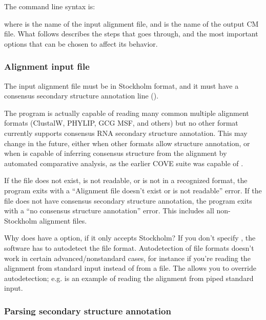 The  command line syntax is:


where \prog{[alifile]} is the name of the input alignment file, and
\prog{[cmfile]} is the name of the output CM file. What follows
describes the steps that  goes through, and the most
important options that can be chosen to affect its behavior.

\subsubsection{Alignment input file}

The input alignment file must be in Stockholm format, and it must have
a consensus secondary structure annotation line ().

The program is actually capable of reading many common multiple
alignment formats (ClustalW, PHYLIP, GCG MSF, and others) but no other
format currently supports consensus RNA secondary structure
annotation. This may change in the future, either when other formats
allow structure annotation, or when  is capable of
inferring consensus structure from the alignment by automated
comparative analysis, as the earlier COVE suite was capable
of \citep{Eddy94}. 

If the file does not exist, is not readable, or is not in a recognized
format, the program exits with a ``Alignment file doesn't exist or is
not readable'' error. If the file does not have consensus secondary
structure annotation, the program exits with a ``no consensus
structure annotation'' error. This includes all non-Stockholm
alignment files.

\begin{srefaq}{Why does  have a  option, if it only
accepts Stockholm?} If you don't specify , the
software has to autodetect the file format. Autodetection of file
formats doesn't work in certain advanced/nonstandard cases, for
instance if you're reading the alignment from standard input instead
of from a file. The  allows you to override
autodetection; e.g.  is an example of reading the alignment from piped standard
input.
\end{srefaq}

\subsubsection{Parsing secondary structure annotation}

